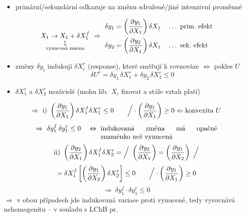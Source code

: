 \begingroup\color{Red}
\begin{itemize}
  \item primární/sekundární odkazuje na změnu sdružené/jiné intenzivní proměnné
\end{itemize}
\[
  \underset{\substack{\updownarrow\\ \text{vynucená změna}}}{X_1\to X_1 + \delta X_1^f}
  \ \Rightarrow\
  \begin{aligned}
    \delta y_1 &= \left(\pdv{y_1}{X_1}\right)\delta X_1 && \dots\ \text{prim.\ efekt} \\
    \delta y_2 &= \left(\pdv{y_2}{X_1}\right)\delta X_1 && \dots\ \text{sek.\ efekt}
  \end{aligned}
\]
\begin{itemize}
  \item změny $\delta y_i$ indukují $\delta X_i^r$ (response), které směřují k rovnováze $\Leftrightarrow$ pokles $U$
  \[ \delta U^r = \delta y_1\,\delta X_1^r + \delta y_2\,\delta X_2^r \leq 0 \]
  \item $\delta X_1^r$ a $\delta X_2^r$ nezávislé (mohu lib.\ $X_i$ fixovat a stále vztah platí)
\end{itemize}
\[
  \Rightarrow\ \text{i)}\ \left(\pdv{y_1}{X_1}\right)\delta X_1^f\delta X_1^r \leq 0
  \qquad \Big/\cdot\left(\pdv{y_1}{X_1}\right) \geq 0 \Leftarrow \text{konvexita } U
\]
\[
  \Rightarrow\ \delta y_1^f\,\delta y_1^r \leq 0 \quad \Leftrightarrow\ \text{\parbox[t]{6cm}{indukovaná změna má opačné znaménko než vynucená}}
\]
\[
  \text{ii)}\ \left(\pdv{y_2}{X_1}\right)\delta X_1^f\delta X_2^r = \Big/\ \left(\pdv{y_2}{X_1}\right) = \left(\pdv{y_1}{X_2}\right)\ \Big/
\]
\[
  = \delta X_1^f\left[\left(\pdv{y_1}{X_2}\right)\delta X_2^r\right] \leq 0 \qquad \Big/\cdot\left(\pdv{y_1}{X_1}\right) \geq 0
\]
\[
  \Rightarrow\ \delta y_1^f\cdot\delta y_1^r \leq 0
\]
$\Rightarrow$ v obou případech jde indukovaná variace proti vynucené, tedy vyrovnává nehomogenitu -- v souladu s LChB pr.
\endgroup

